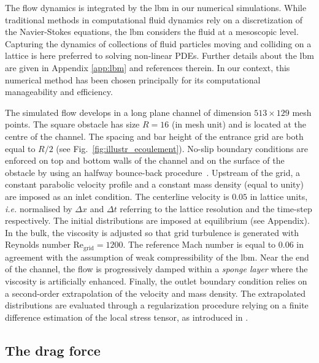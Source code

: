\documentclass{jfm}
\begin{document}
%
The flow dynamics is integrated by the \ac{lbm} in our numerical simulations.
While traditional methods in computational fluid dynamics rely on a discretization of the Navier-Stokes equations, the \ac{lbm} considers the fluid at a mesoscopic level.
Capturing the dynamics of collections of fluid particles moving and colliding on a lattice is here preferred to solving non-linear PDEs.
Further details about the \ac{lbm} are given in Appendix \ref{app:lbm} and references therein.
In our context, this numerical method has been chosen principally for its computational manageability and efficiency.


%
The simulated flow develops in a long plane channel of dimension $513 \times 129$ mesh points. The square obstacle has size $R=16$ (in mesh unit) and is located at the centre of the channel. The spacing and bar height of the entrance grid are both equal to $R/2$ (see Fig.~\ref{fig:illustr_ecoulement}).
%
No-slip boundary conditions are enforced on top and bottom walls of the channel and on the surface of the obstacle by using an halfway bounce-back procedure~\citep{lbm_book}.
%
Upstream of the grid, a constant parabolic velocity profile and a constant mass density (equal to unity) are imposed as an inlet condition.
The centerline velocity is $0.05$ in lattice units, \textit{i.e.} normalised by $\Delta x$ and $\Delta t$ referring to the lattice resolution and the time-step respectively. The initial distributions are imposed at equilibrium (see Appendix).
In the bulk, the viscosity is adjusted so that grid turbulence is generated with Reynolds number $\mathrm{Re_{grid}}=1200$. The reference Mach number is equal to $0.06$ in agreement with the assumption of weak compressibility of the \ac{lbm}.
Near the end of the channel, the flow is progressively damped within a \textit{sponge layer} where the viscosity is artificially enhanced.
Finally, the outlet boundary condition relies on a second-order extrapolation of the velocity and mass density.
The extrapolated distributions are evaluated through a regularization procedure relying on a finite difference estimation of the local stress tensor, as introduced in \cite{latt2008straight}.


\subsection{The drag force}
\label{sec:drag_force}
\end{document}
